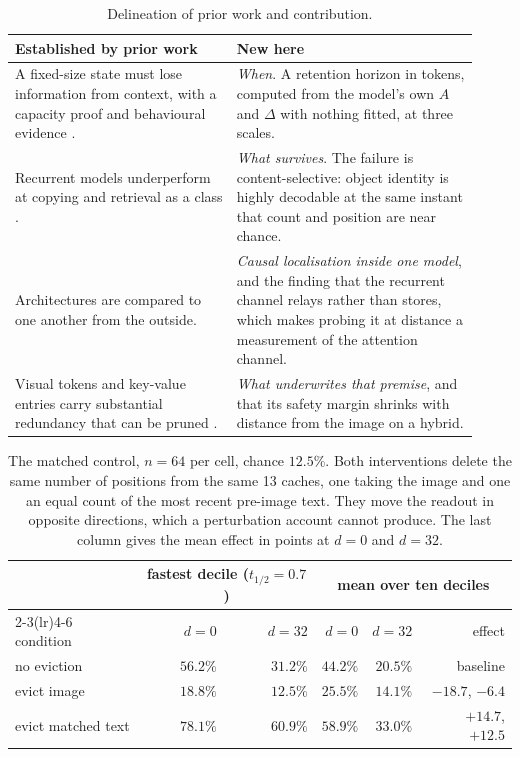 \begin{table}[h]
\centering\small
\begin{tabular}{p{0.44\linewidth}p{0.48\linewidth}}
\toprule
\textbf{Established by prior work} & \textbf{New here} \\
\midrule
A fixed-size state must lose information from context, with a capacity proof
and behavioural evidence \citep{jelassi2024copying,merrill2024illusion,wen2024rnns}.
& \emph{When}. A retention horizon in tokens, computed from the model's own
$A$ and $\Delta$ with nothing fitted, at three scales. \\
\addlinespace
Recurrent models underperform at copying and retrieval as a class
\citep{arora2023zoology,arora2024based}.
& \emph{What survives}. The failure is content-selective: object identity is
highly decodable at the same instant that count and position are near chance. \\
\addlinespace
Architectures are compared to one another from the outside.
& \emph{Causal localisation inside one model}, and the finding that the
recurrent channel relays rather than stores, which makes probing it at distance
a measurement of the attention channel. \\
\addlinespace
Visual tokens and key-value entries carry substantial redundancy that can be
pruned \citep{chen2024fastv,yang2024visionzip,shang2025prumerge}.
& \emph{What underwrites that premise}, and that its safety margin shrinks
with distance from the image on a hybrid. \\
\bottomrule
\end{tabular}
\caption{Delineation of prior work and contribution.}
\label{tab:novelty}
\end{table}

\begin{table}[h]
\centering\small
\begin{tabular}{lrrrrr}
\toprule
& \multicolumn{2}{c}{fastest decile ($t_{1/2} = 0.7$)} & \multicolumn{3}{c}{mean over ten deciles} \\
\cmidrule(lr){2-3}\cmidrule(lr){4-6}
condition & $d{=}0$ & $d{=}32$ & $d{=}0$ & $d{=}32$ & effect \\
\midrule
no eviction               & $56.2\%$ & $31.2\%$ & $44.2\%$ & $20.5\%$ & baseline \\
evict image               & $18.8\%$ & $12.5\%$ & $25.5\%$ & $14.1\%$ & $-18.7$, $-6.4$ \\
evict matched text        & $78.1\%$ & $60.9\%$ & $58.9\%$ & $33.0\%$ & $+14.7$, $+12.5$ \\
\bottomrule
\end{tabular}
\caption{The matched control, $n = 64$ per cell, chance $12.5\%$. Both
interventions delete the same number of positions from the same 13 caches, one
taking the image and one an equal count of the most recent pre-image text. They
move the readout in opposite directions, which a perturbation account cannot
produce. The last column gives the mean effect in points at $d{=}0$ and
$d{=}32$.}
\label{tab:controls}
\end{table}

